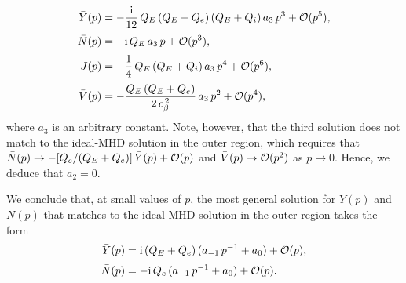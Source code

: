 \documentclass[12pt,prb,aps]{revtex4-1}
\begin{document}
\begin{align}
\bar{Y}(p)& =- \frac{{\rm i}}{12}\,Q_E\,(Q_E+Q_e)\,(Q_E+Q_i)\,a_3\,p^3+{\cal O}(p^5),\\[0.5ex]
\bar{N}(p) &=-{\rm i}\, Q_E\,a_3\,p+{\cal O}(p^3),\\[0.5ex]
\bar{J}(p)&= -\frac{1}{4}\,Q_E\,(Q_E+Q_i)\,a_3\,p^4+{\cal O}(p^6),\\[0.5ex]
\bar{V}(p) &=- \frac{Q_E\,(Q_E+Q_e)}{2\,c_\beta^{\,2}}\,a_3\,p^2+{\cal O}(p^4),
\end{align}
where $a_3$ is an arbitrary constant. Note, however, that the third solution does not match to the ideal-MHD solution in the outer region, which requires that 
$\bar{N}(p) \rightarrow- [Q_e/(Q_E+Q_e)]\,\bar{Y}(p) + {\cal O}(p)$ and  $\bar{V}(p)\rightarrow {\cal O}(p^2)$
as $p\rightarrow 0$. Hence, we deduce that $a_2=0$. 

We conclude that, at small values of $p$, the most general solution for $\bar{Y}(p)$ and $\bar{N}(p)$ that matches to the ideal-MHD solution in the outer region  takes the form 
\begin{align}\label{yy}
\bar{Y}(p) &= {\rm i}\,(Q_E+Q_e)\,(a_{-1} \,p^{-1}+a_0)+ {\cal O}(p),\\[0.5ex]
\bar{N}(p) &= -{\rm i}\,Q_e\,(a_{-1}\,p^{-1} +a_0)+ {\cal O}(p).\label{nn}
\end{align}
\end{document}
